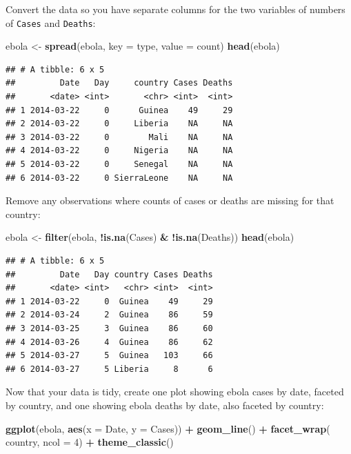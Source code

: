 \documentclass[]{book}
\makeatletter
\newenvironment{Shaded}{\begin{snugshade}}{\end{snugshade}}
\newcommand{\KeywordTok}[1]{\textcolor[rgb]{0.13,0.29,0.53}{\textbf{#1}}}
\newcommand{\DataTypeTok}[1]{\textcolor[rgb]{0.13,0.29,0.53}{#1}}
\newcommand{\DecValTok}[1]{\textcolor[rgb]{0.00,0.00,0.81}{#1}}
\newcommand{\StringTok}[1]{\textcolor[rgb]{0.31,0.60,0.02}{#1}}
\newcommand{\OperatorTok}[1]{\textcolor[rgb]{0.81,0.36,0.00}{\textbf{#1}}}
\newcommand{\NormalTok}[1]{#1}
\newenvironment{kframe}{%
\medskip{}
\setlength{\fboxsep}{.8em}
 \def\at@end@of@kframe{}%
 \ifinner\ifhmode%
  \def\at@end@of@kframe{\end{minipage}}%
  \begin{minipage}{\columnwidth}%
 \fi\fi%
 \def\FrameCommand##1{\hskip\@totalleftmargin \hskip-\fboxsep
 \colorbox{shadecolor}{##1}\hskip-\fboxsep
     \hskip-\linewidth \hskip-\@totalleftmargin \hskip\columnwidth}%
 \MakeFramed {\advance\hsize-\width
   \@totalleftmargin\z@ \linewidth\hsize
   \@setminipage}}%
 {\par\unskip\endMakeFramed%
 \at@end@of@kframe}
\renewenvironment{Shaded}{\begin{kframe}}{\end{kframe}}
\theoremstyle{definition}
\theoremstyle{definition}
\theoremstyle{definition}
\theoremstyle{remark}
\makeatother
\begin{document}
Convert the data so you have separate columns for the two variables of
numbers of \texttt{Cases} and \texttt{Deaths}:

\begin{Shaded}
\begin{Highlighting}[]
\NormalTok{ebola <-}\StringTok{ }\KeywordTok{spread}\NormalTok{(ebola, }\DataTypeTok{key =}\NormalTok{ type, }\DataTypeTok{value =}\NormalTok{ count)}
\KeywordTok{head}\NormalTok{(ebola)}
\end{Highlighting}
\end{Shaded}

\begin{verbatim}
## # A tibble: 6 x 5
##         Date   Day     country Cases Deaths
##       <date> <int>       <chr> <int>  <int>
## 1 2014-03-22     0      Guinea    49     29
## 2 2014-03-22     0     Liberia    NA     NA
## 3 2014-03-22     0        Mali    NA     NA
## 4 2014-03-22     0     Nigeria    NA     NA
## 5 2014-03-22     0     Senegal    NA     NA
## 6 2014-03-22     0 SierraLeone    NA     NA
\end{verbatim}

Remove any observations where counts of cases or deaths are missing for
that country:

\begin{Shaded}
\begin{Highlighting}[]
\NormalTok{ebola <-}\StringTok{ }\KeywordTok{filter}\NormalTok{(ebola, }\OperatorTok{!}\KeywordTok{is.na}\NormalTok{(Cases) }\OperatorTok{&}\StringTok{ }\OperatorTok{!}\KeywordTok{is.na}\NormalTok{(Deaths))}
\KeywordTok{head}\NormalTok{(ebola)}
\end{Highlighting}
\end{Shaded}

\begin{verbatim}
## # A tibble: 6 x 5
##         Date   Day country Cases Deaths
##       <date> <int>   <chr> <int>  <int>
## 1 2014-03-22     0  Guinea    49     29
## 2 2014-03-24     2  Guinea    86     59
## 3 2014-03-25     3  Guinea    86     60
## 4 2014-03-26     4  Guinea    86     62
## 5 2014-03-27     5  Guinea   103     66
## 6 2014-03-27     5 Liberia     8      6
\end{verbatim}

Now that your data is tidy, create one plot showing ebola cases by date,
faceted by country, and one showing ebola deaths by date, also faceted
by country:

\begin{Shaded}
\begin{Highlighting}[]
\KeywordTok{ggplot}\NormalTok{(ebola, }\KeywordTok{aes}\NormalTok{(}\DataTypeTok{x =}\NormalTok{ Date, }\DataTypeTok{y =}\NormalTok{ Cases)) }\OperatorTok{+}\StringTok{ }
\StringTok{        }\KeywordTok{geom_line}\NormalTok{() }\OperatorTok{+}\StringTok{ }
\StringTok{        }\KeywordTok{facet_wrap}\NormalTok{(}\OperatorTok{~}\StringTok{ }\NormalTok{country, }\DataTypeTok{ncol =} \DecValTok{4}\NormalTok{) }\OperatorTok{+}\StringTok{ }
\StringTok{        }\KeywordTok{theme_classic}\NormalTok{()}
\end{Highlighting}
\end{Shaded}
\end{document}
